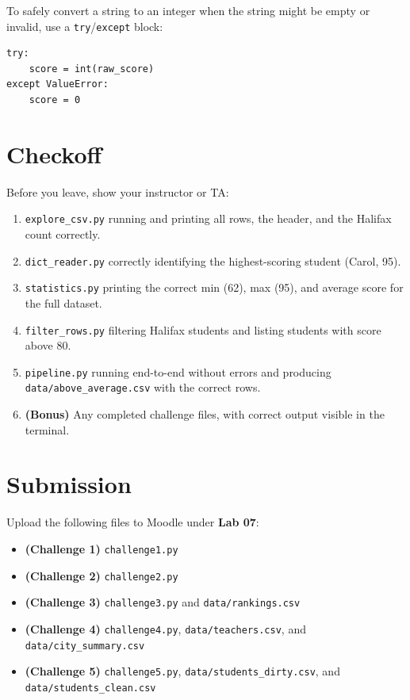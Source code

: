 \documentclass{cslab}
\begin{document}
\begin{hint}
To safely convert a string to an integer when the string might be empty or invalid, use a \texttt{try}/\texttt{except} block:
\begin{lstlisting}[numbers=none]
try:
    score = int(raw_score)
except ValueError:
    score = 0
\end{lstlisting}
\end{hint}


\section{Checkoff}

Before you leave, show your instructor or TA:
\begin{enumerate}
    \item \texttt{explore\_csv.py} running and printing all rows, the header, and the Halifax count correctly.
    \item \texttt{dict\_reader.py} correctly identifying the highest-scoring student (Carol, 95).
    \item \texttt{statistics.py} printing the correct min (62), max (95), and average score for the full dataset.
    \item \texttt{filter\_rows.py} filtering Halifax students and listing students with score above 80.
    \item \texttt{pipeline.py} running end-to-end without errors and producing \texttt{data/above\_average.csv} with the correct rows.
    \item \textbf{(Bonus)} Any completed challenge files, with correct output visible in the terminal.
\end{enumerate}


\section{Submission}

Upload the following files to Moodle under \textbf{Lab 07}:

\begin{itemize}
    \item \textbf{(Challenge 1)} \texttt{challenge1.py}
    \item \textbf{(Challenge 2)} \texttt{challenge2.py}
    \item \textbf{(Challenge 3)} \texttt{challenge3.py} and \texttt{data/rankings.csv}
    \item \textbf{(Challenge 4)} \texttt{challenge4.py}, \texttt{data/teachers.csv}, and \texttt{data/city\_summary.csv}
    \item \textbf{(Challenge 5)} \texttt{challenge5.py}, \texttt{data/students\_dirty.csv}, and \texttt{data/students\_clean.csv}
\end{itemize}

\end{document}
